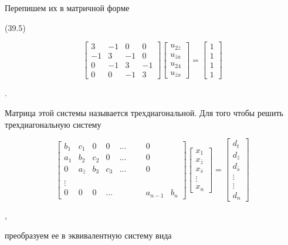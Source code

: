 \documentclass[
  ukrainian,
]{article}
\begin{document}
Перепишем их в матричной форме

(39.5)

\[
\begin{bmatrix} 3 & -1 & 0 & 0 \\ -1 & 3 & -1 & 0 \\ 0 & -1 & 3 & -1 \\ 0 & 0 & -1 & 3 \end{bmatrix}
\begin{bmatrix} u_{2\bar{z}} \\ u_{\bar{z}a} \\ u_{24} \\ u_{\bar{z}x} \end{bmatrix}
=
\begin{bmatrix} 1 \\ 1 \\ 1 \\ 1 \end{bmatrix}
\]

.

Матрица этой системы называется трехдиагональной. Для того чтобы решить
трехдиагональную систему

\[
\begin{bmatrix} b_1 & c_1 & 0 & 0 & \dots & & & 0 \\ a_1 & b_2 & c_2 & 0 & \dots & & & 0 \\ 0 & a_{\bar{z}} & b_3 & c_3 & \dots & & & 0 \\ & & & & & & & & \\ \vdots & & & & & & & & \\ 0 & 0 & 0 & \dots & & & & a_{n-1} & b_n \end{bmatrix}
\begin{bmatrix} x_1 \\ x_{\bar{z}} \\ x_{\bar{s}} \\ \vdots \\ x_n \end{bmatrix}
=
\begin{bmatrix} d_t \\ d_{\bar{z}} \\ d_{\bar{s}} \\ \vdots \\ \vdots \\ d_n \end{bmatrix}
\]

,

преобразуем ее в эквивалентную систему вида
\end{document}
